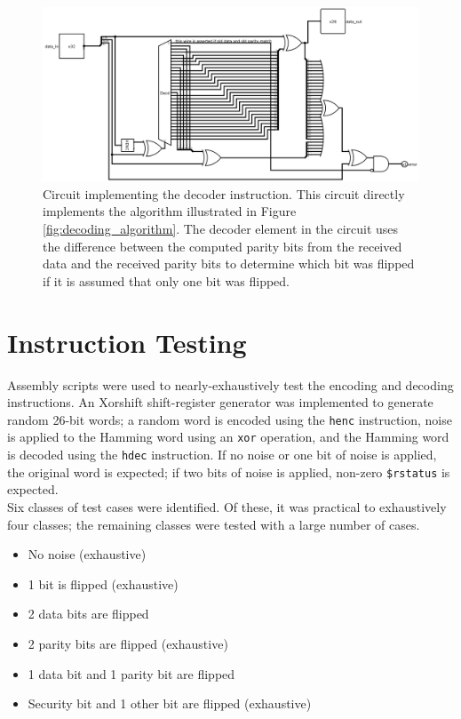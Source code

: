 \documentclass[letterpaper]{article} %
\begin{document}
\begin{center}
\begin{figure}
	\includegraphics[width=1\textwidth]{decoder_circuit.png}
	\caption{Circuit implementing the decoder instruction. This circuit directly implements the algorithm illustrated in Figure \ref{fig:decoding_algorithm}. The decoder element in the circuit uses the difference between the computed parity bits from the received data and the received parity bits to determine which bit was flipped if it is assumed that only one bit was flipped.}
	\label{fig:decoder_circuit}
\end{figure}
\end{center}

\section{Instruction Testing}
Assembly scripts were used to nearly-exhaustively test the encoding and decoding instructions. An Xorshift shift-register generator was implemented to generate random 26-bit words; a random word is encoded using the \texttt{henc} instruction, noise is applied to the Hamming word using an \texttt{xor} operation, and the Hamming word is decoded using the \texttt{hdec} instruction. If no noise or one bit of noise is applied, the original word is expected; if two bits of noise is applied, non-zero \texttt{\$rstatus} is expected.\\

\noindent
Six classes of test cases were identified. Of these, it was practical to exhaustively four classes; the remaining classes were tested with a large number of cases.
\begin{itemize}
	\item No noise (exhaustive)
	\item 1 bit is flipped (exhaustive)
	\item 2 data bits are flipped
	\item 2 parity bits are flipped (exhaustive)
	\item 1 data bit and 1 parity bit are flipped
	\item Security bit and 1 other bit are flipped (exhaustive)
\end{itemize}
\end{document}

